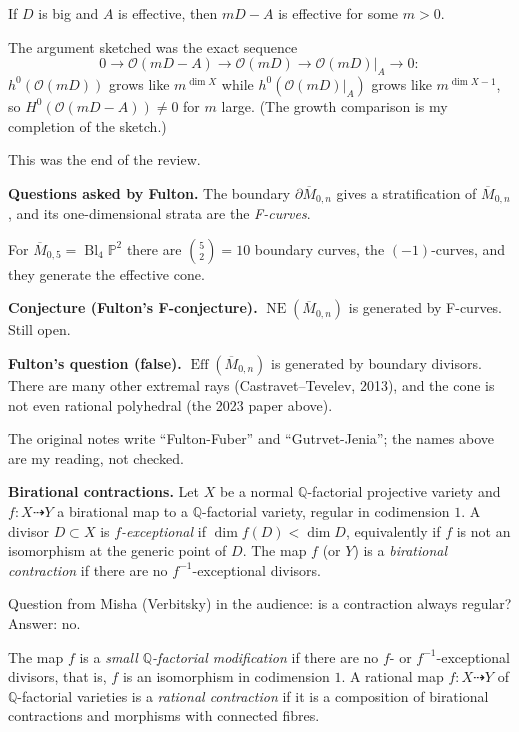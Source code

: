 \begin{lemma}
\label{lemma-tevelev-kodaira}
If $D$ is big and $A$ is effective, then
$mD-A$ is effective for some $m>0$.
\end{lemma}

The argument sketched was the exact
sequence
$$
0\to\mathcal{O}(mD-A)\to\mathcal{O}(mD)
\to\mathcal{O}(mD)|_A\to 0:
$$
$h^0(\mathcal{O}(mD))$ grows like
$m^{\dim X}$ while
$h^0(\mathcal{O}(mD)|_A)$ grows like
$m^{\dim X-1}$, so
$H^0(\mathcal{O}(mD-A))\neq 0$ for $m$
large. (The growth comparison is my
completion of the sketch.)

This was the end of the review.

\medskip\noindent
{\bf Questions asked by Fulton.} The
boundary $\partial\overline{M}_{0,n}$ gives
a stratification of $\overline{M}_{0,n}$, and
its one-dimensional strata are the
\emph{F-curves}.

\begin{example}
\label{example-tevelev-m05}
For $\overline{M}_{0,5}=\operatorname{Bl}_4
\mathbb{P}^2$ there are
$\binom{5}{2}=10$ boundary curves, the
$(-1)$-curves, and they generate the
effective cone.
\end{example}

\medskip\noindent
{\bf Conjecture (Fulton's F-conjecture).}
$\operatorname{NE}(\overline{M}_{0,n})$ is
generated by F-curves. Still open.

\medskip\noindent
{\bf Fulton's question (false).}
$\operatorname{Eff}(\overline{M}_{0,n})$ is
generated by boundary divisors. There are
many other extremal rays
(Castravet--Tevelev, 2013), and the cone is
not even rational polyhedral (the 2023
paper above).

The original notes write ``Fulton-Fuber''
and ``Gutrvet-Jenia''; the names above are my
reading, not checked.

\medskip\noindent
{\bf Birational contractions.} Let $X$ be a
normal $\mathbb{Q}$-factorial projective
variety and $f\colon X\dashrightarrow Y$ a
birational map to a $\mathbb{Q}$-factorial
variety, regular in codimension $1$. A
divisor $D\subset X$ is
\emph{$f$-exceptional} if
$\dim f(D)<\dim D$, equivalently if $f$ is
not an isomorphism at the generic point of
$D$. The map $f$ (or $Y$) is a
\emph{birational contraction} if there are
no $f^{-1}$-exceptional divisors.

Question from Misha (Verbitsky) in the
audience: is a contraction always regular?
Answer: no.

The map $f$ is a \emph{small
$\mathbb{Q}$-factorial modification} if
there are no $f$- or $f^{-1}$-exceptional
divisors, that is, $f$ is an isomorphism in
codimension $1$. A rational map
$f\colon X\dashrightarrow Y$ of
$\mathbb{Q}$-factorial varieties is a
\emph{rational contraction} if it is a
composition of birational contractions and
morphisms with connected fibres.

